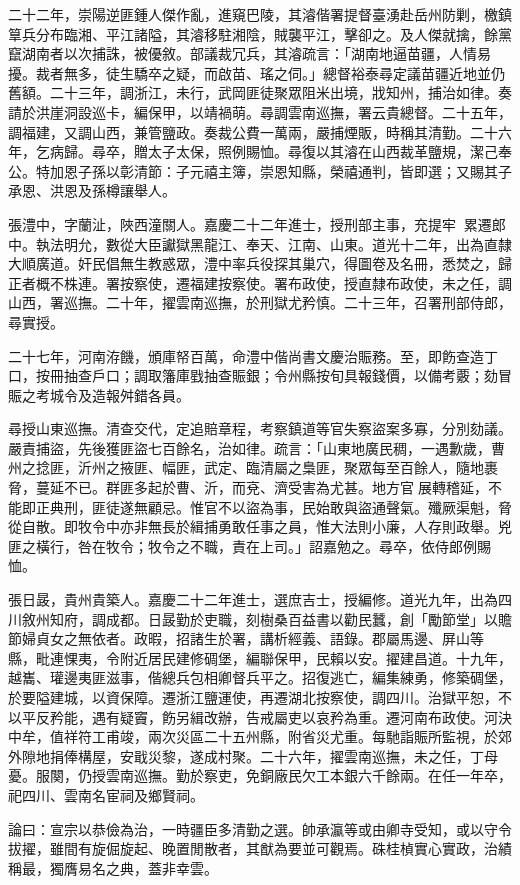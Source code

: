 \begin{pinyinscope}
二十二年，崇陽逆匪鍾人傑作亂，進窺巴陵，其濬偕署提督臺湧赴岳州防剿，檄鎮筸兵分布臨湘、平江諸隘，其濬移駐湘陰，賊襲平江，擊卻之。及人傑就擒，餘黨竄湖南者以次捕誅，被優敘。部議裁冗兵，其濬疏言：「湖南地逼苗疆，人情易擾。裁者無多，徒生驕卒之疑，而啟苗、瑤之伺。」總督裕泰尋定議苗疆近地並仍舊額。二十三年，調浙江，未行，武岡匪徒聚眾阻米出境，戕知州，捕治如律。奏請於洪崖洞設巡卡，編保甲，以靖禍萌。尋調雲南巡撫，署云貴總督。二十五年，調福建，又調山西，兼管鹽政。奏裁公費一萬兩，嚴捕煙販，時稱其清勤。二十六年，乞病歸。尋卒，贈太子太保，照例賜恤。尋復以其濬在山西裁革鹽規，潔己奉公。特加恩子孫以彰清節：子元禧主簿，崇恩知縣，榮禧通判，皆即選；又賜其子承恩、洪恩及孫樽讓舉人。

張澧中，字蘭沚，陜西潼關人。嘉慶二十二年進士，授刑部主事，充提牢，累遷郎中。執法明允，數從大臣讞獄黑龍江、奉天、江南、山東。道光十二年，出為直隸大順廣道。奸民倡無生教惑眾，澧中率兵役探其巢穴，得圖卷及名冊，悉焚之，歸正者概不株連。署按察使，遷福建按察使。署布政使，授直隸布政使，未之任，調山西，署巡撫。二十年，擢雲南巡撫，於刑獄尤矜慎。二十三年，召署刑部侍郎，尋實授。

二十七年，河南洊饑，頒庫帑百萬，命澧中偕尚書文慶治賑務。至，即飭查造丁口，按冊抽查戶口；調取籓庫戥抽查賑銀；令州縣按旬具報錢價，以備考覈；劾冒賑之考城令及造報舛錯各員。

尋授山東巡撫。清查交代，定追賠章程，考察鎮道等官失察盜案多寡，分別劾議。嚴責捕盜，先後獲匪盜七百餘名，治如律。疏言：「山東地廣民稠，一遇歉歲，曹州之捻匪，沂州之掖匪、幅匪，武定、臨清屬之梟匪，聚眾每至百餘人，隨地裹脅，蔓延不已。群匪多起於曹、沂，而兗、濟受害為尤甚。地方官展轉稽延，不能即正典刑，匪徒遂無顧忌。惟官不以盜為事，民始敢與盜通聲氣。殲厥渠魁，脅從自散。即牧令中亦非無長於緝捕勇敢任事之員，惟大法則小廉，人存則政舉。兇匪之橫行，咎在牧令；牧令之不職，責在上司。」詔嘉勉之。尋卒，依侍郎例賜恤。

張日晸，貴州貴築人。嘉慶二十二年進士，選庶吉士，授編修。道光九年，出為四川敘州知府，調成都。日晸勤於吏職，刻樹桑百益書以勸民蠶，創「勵節堂」以贍節婦貞女之無依者。政暇，招諸生於署，講析經義、語錄。郡屬馬邊、屏山等縣，毗連惈夷，令附近居民建修碉堡，編聯保甲，民賴以安。擢建昌道。十九年，越巂、瓘邊夷匪滋事，偕總兵包相卿督兵平之。招復逃亡，編集練勇，修築碉堡，於要隘建城，以資保障。遷浙江鹽運使，再遷湖北按察使，調四川。治獄平恕，不以平反矜能，遇有疑竇，飭另緝改辦，告戒屬吏以哀矜為重。遷河南布政使。河決中牟，值祥符工甫竣，兩次災區二十五州縣，附省災尤重。每馳詣賑所監視，於郊外隙地捐俸構屋，安戢災黎，遂成村聚。二十六年，擢雲南巡撫，未之任，丁母憂。服闋，仍授雲南巡撫。勤於察吏，免銅廠民欠工本銀六千餘兩。在任一年卒，祀四川、雲南名宦祠及鄉賢祠。

論曰：宣宗以恭儉為治，一時疆臣多清勤之選。帥承瀛等或由卿寺受知，或以守令拔擢，雖間有旋倔旋起、晚置閒散者，其猷為要並可觀焉。硃桂楨實心實政，治績稱最，獨膺易名之典，蓋非幸雲。


\end{pinyinscope}